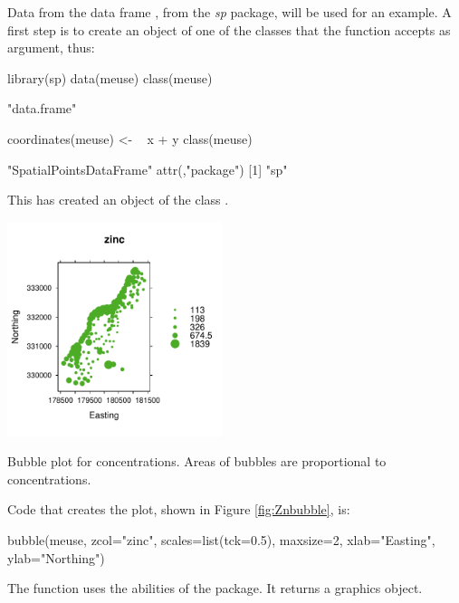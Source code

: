 Data from the data frame , from the \textit{sp} package, will be used for an
example.  A first step is to create an object of one of the classes
that the function  accepts as argument, thus:
\begin{Schunk}
\begin{Sinput}
library(sp)
data(meuse)
class(meuse)
\end{Sinput}
\begin{Soutput}
[1] "data.frame"
\end{Soutput}
\begin{Sinput}
coordinates(meuse) <- ~ x + y
class(meuse)
\end{Sinput}
\begin{Soutput}
[1] "SpatialPointsDataFrame"
attr(,"package")
[1] "sp"
\end{Soutput}
\end{Schunk}
\noindent
This has created an object of the class .
\begin{marginfigure}[-15pt]
\vspace*{-9pt}
\begin{Schunk}


\centerline{\includegraphics[width=0.47\textwidth]{figs/06-bubble-1} }

\end{Schunk}
\caption{Bubble plot for  concentrations.  Areas of
  bubbles are proportional to concentrations.\label{fig:Znbubble}}
\end{marginfigure}
Code that creates the plot, shown in Figure \ref{fig:Znbubble}, is:
\begin{Schunk}
\begin{Sinput}
bubble(meuse, zcol="zinc", scales=list(tck=0.5),
       maxsize=2, xlab="Easting", ylab="Northing")
\end{Sinput}
\end{Schunk}
\noindent
The function  uses the abilities of the 
package.  It returns a  graphics object.

